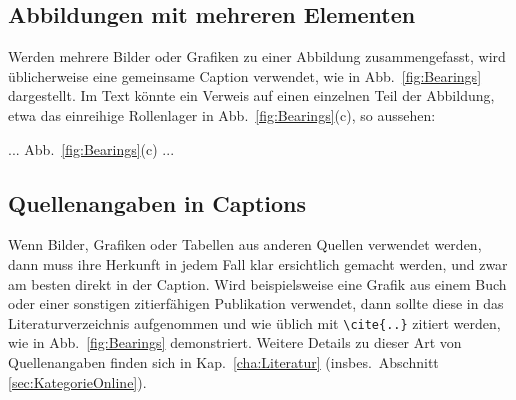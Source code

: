 \subsection{Abbildungen mit mehreren Elementen}

Werden mehrere Bilder oder Grafiken zu einer Abbildung zusammengefasst, 
wird üblicherweise eine gemeinsame Caption verwendet, wie in Abb.~\ref{fig:Bearings}
dargestellt. Im Text könnte ein Verweis auf einen einzelnen Teil der Abbildung, etwa das 
einreihige Rollenlager in Abb.~\ref{fig:Bearings}(c), so aussehen:
%
\begin{LaTeXCode}[numbers=none]
    ... Abb.~\ref{fig:Bearings}(c) ... 
\end{LaTeXCode}


\subsection{Quellenangaben in Captions}
\label{sec:QuellenangabenInCaptions}

Wenn Bilder, Grafiken oder Tabellen aus anderen Quellen verwendet werden, dann 
muss ihre Herkunft in jedem Fall klar ersichtlich gemacht werden, und zwar am 
besten direkt in der Caption.
Wird beispielsweise eine Grafik aus einem Buch oder einer sonstigen 
zitierfähigen Publikation verwendet, dann sollte diese in das Literaturverzeichnis 
aufgenommen und wie üblich mit
\verb!\cite{..}! zitiert werden, wie in Abb.\ \ref{fig:Bearings} demonstriert. 
Weitere Details zu dieser Art von Quellenangaben finden sich in 
Kap.\ \ref{cha:Literatur} (insbes.\ Abschnitt \ref{sec:KategorieOnline}).

